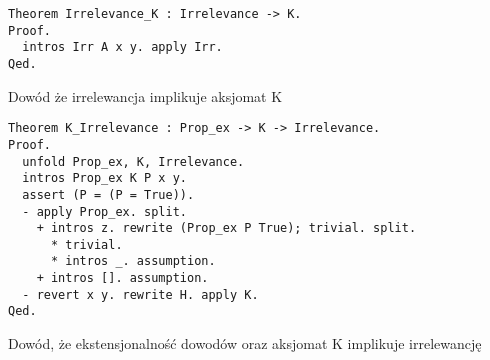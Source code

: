 \begin{code}
\begin{verbatim}
Theorem Irrelevance_K : Irrelevance -> K.
Proof.
  intros Irr A x y. apply Irr.
Qed. 
\end{verbatim}
\caption{Dowód że irrelewancja implikuje aksjomat K}
\label{Irrelevance_K}
\end{code}

\begin{code}
\begin{verbatim}
Theorem K_Irrelevance : Prop_ex -> K -> Irrelevance.
Proof.
  unfold Prop_ex, K, Irrelevance.
  intros Prop_ex K P x y. 
  assert (P = (P = True)).
  - apply Prop_ex. split.
    + intros z. rewrite (Prop_ex P True); trivial. split.
      * trivial.
      * intros _. assumption.
    + intros []. assumption.
  - revert x y. rewrite H. apply K.
Qed. 
\end{verbatim}
\caption{Dowód, że ekstensjonalność dowodów oraz aksjomat K implikuje irrelewancję}
\label{K_Irrelevance}
\end{code}

